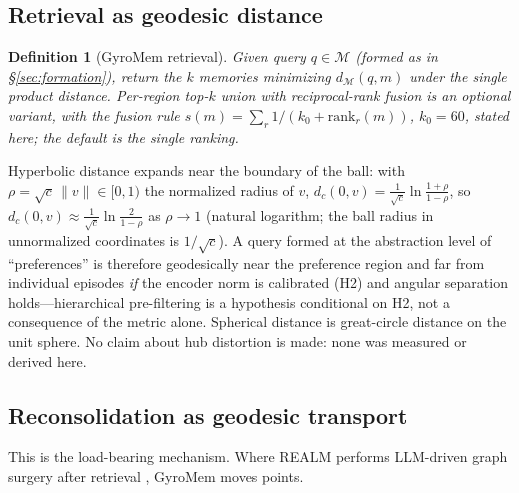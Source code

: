 \documentclass[11pt,a4paper]{article}
\newtheorem{definition}{Definition}
\newcommand{\M}{\mathcal{M}}
\begin{document}
\subsection{Retrieval as geodesic distance}
\label{sec:retrieval}

\begin{definition}[GyroMem retrieval]
Given query $q \in \M$ (formed as in \S\ref{sec:formation}), return the
$k$ memories minimizing $d_{\M}(q, m)$ under the single product distance.
Per-region top-$k$ union with reciprocal-rank fusion is an optional
variant, with the fusion rule $s(m) = \sum_r 1/(k_0 + \mathrm{rank}_r(m))$,
$k_0 = 60$, stated here; the default is the single ranking.
\end{definition}

Hyperbolic distance expands near the boundary of the ball: with
$\rho = \sqrt{c}\,\|v\| \in [0,1)$ the normalized radius of $v$,
$d_c(0,v) = \frac{1}{\sqrt{c}}\ln\frac{1+\rho}{1-\rho}$, so
$d_c(0,v) \approx \frac{1}{\sqrt{c}}\ln\frac{2}{1-\rho}$ as
$\rho \to 1$ (natural logarithm; the ball radius in unnormalized
coordinates is $1/\sqrt{c}$). A query formed at the abstraction
level of ``preferences'' is therefore geodesically near the preference
region and far from individual episodes \emph{if} the encoder norm is
calibrated (H2) and angular separation holds---hierarchical pre-filtering
is a hypothesis conditional on H2, not a consequence of the metric alone.
Spherical distance is great-circle distance on the unit sphere. No claim
about hub distortion is made: none was measured or derived here.

\subsection{Reconsolidation as geodesic transport}
\label{sec:reconsolidation}

This is the load-bearing mechanism. Where REALM performs LLM-driven graph
surgery after retrieval \cite{realm}, GyroMem moves points.
\end{document}

